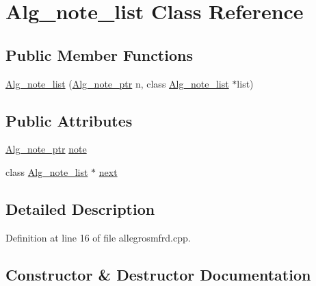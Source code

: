 \hypertarget{class_alg__note__list}{}\section{Alg\+\_\+note\+\_\+list Class Reference}
\label{class_alg__note__list}
\subsection*{Public Member Functions}
\begin{DoxyCompactItemize}
\item 
\hyperlink{class_alg__note__list_ac51f9b01c1d650ce894daae748117ede}{Alg\+\_\+note\+\_\+list} (\hyperlink{allegro_8h_a49bc03b187e4468a764d73df4c860206}{Alg\+\_\+note\+\_\+ptr} n, class \hyperlink{class_alg__note__list}{Alg\+\_\+note\+\_\+list} $\ast$list)
\end{DoxyCompactItemize}
\subsection*{Public Attributes}
\begin{DoxyCompactItemize}
\item 
\hyperlink{allegro_8h_a49bc03b187e4468a764d73df4c860206}{Alg\+\_\+note\+\_\+ptr} \hyperlink{class_alg__note__list_aae4fa357edb9c7e8c6610add62f30759}{note}
\item 
class \hyperlink{class_alg__note__list}{Alg\+\_\+note\+\_\+list} $\ast$ \hyperlink{class_alg__note__list_aeca90a9501e13f29bd86768745b59ab4}{next}
\end{DoxyCompactItemize}


\subsection{Detailed Description}


Definition at line 16 of file allegrosmfrd.\+cpp.



\subsection{Constructor \& Destructor Documentation}
